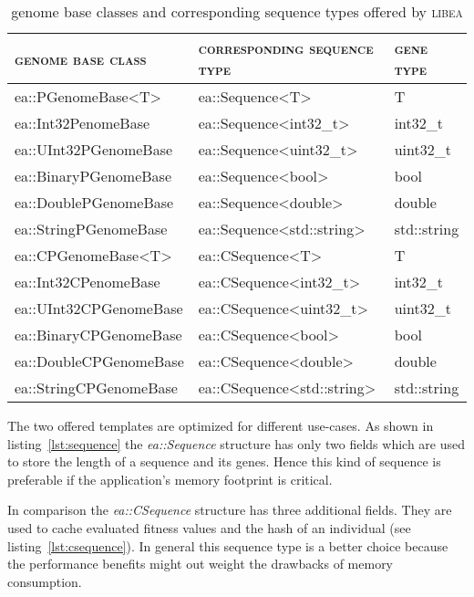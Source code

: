 \documentclass[a4paper]{article}
\begin{document}
\begin{table}[h]
\begin{tabular}{|l|l|l|}
\hline
\textsc{genome base class} & \textsc{corresponding sequence type} & \textsc{gene type} \\
\hline
ea::PGenomeBase\textless T\textgreater & ea::Sequence\textless T\textgreater & T \\
ea::Int32PenomeBase & ea::Sequence\textless int32\_t\textgreater & int32\_t \\
ea::UInt32PGenomeBase & ea::Sequence\textless uint32\_t\textgreater & uint32\_t \\
ea::BinaryPGenomeBase & ea::Sequence\textless bool\textgreater & bool \\
ea::DoublePGenomeBase & ea::Sequence\textless double\textgreater & double \\
ea::StringPGenomeBase & ea::Sequence\textless std::string\textgreater & std::string \\
\hline
ea::CPGenomeBase\textless T\textgreater & ea::CSequence\textless T\textgreater & T \\
ea::Int32CPenomeBase & ea::CSequence\textless int32\_t\textgreater & int32\_t \\
ea::UInt32CPGenomeBase & ea::CSequence\textless uint32\_t\textgreater & uint32\_t \\
ea::BinaryCPGenomeBase & ea::CSequence\textless bool\textgreater & bool \\
ea::DoubleCPGenomeBase & ea::CSequence\textless double\textgreater & double \\
ea::StringCPGenomeBase & ea::CSequence\textless std::string\textgreater & std::string \\
\hline
\end{tabular}
\caption{genome base classes and corresponding sequence types offered by \textsc{libea}}
\label{tab:genome-base-classes-and-sequences}
\end{table}

The two offered templates are optimized for different use-cases. As shown in listing~\ref{lst:sequence} the \textit{ea::Sequence} structure has only two fields which are used to store the length of a sequence and its genes. Hence this kind of sequence is preferable if the application's memory footprint is critical.

In comparison the \textit{ea::CSequence} structure has three additional fields. They are used to cache evaluated fitness values and the hash of an individual (see listing~\ref{lst:csequence}). In general this sequence type is a better choice because the performance benefits might out weight the drawbacks of memory consumption.
\end{document}
